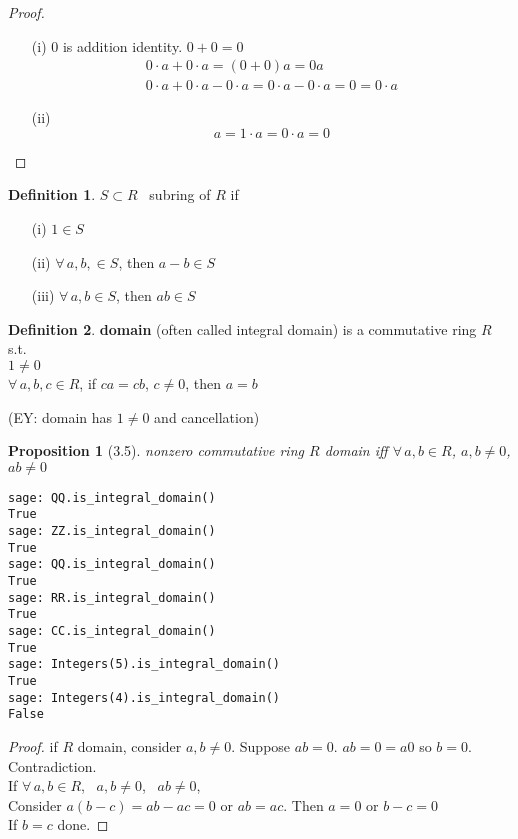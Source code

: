 \documentclass[twoside,landscape]{amsart}
\theoremstyle{plain}
\newtheorem{proposition}{Proposition}
\theoremstyle{definition}
\newtheorem{definition}{Definition}
\theoremstyle{remark}
\begin{document}
\begin{multicols*}{2}
\begin{proof}
  \begin{enumerate}
    \item[(i)] $0$ is addition identity.  $0+0 =0$ \quad \,
\[
\begin{gathered}
  0\cdot a + 0 \cdot a = (  0 + 0 ) a = 0 a \\ 
  0 \cdot a + 0 \cdot a -  0\cdot a = 0 \cdot a - 0\cdot a = 0 = 0\cdot a
\end{gathered}
\]
    \item[(ii)] 
\[
a = 1 \cdot a = 0\cdot a = 0 
\]
\end{enumerate}
\end{proof}


\begin{definition}
$S \subset R$ \quad \, subring of $R$ if 
\begin{enumerate}
\item[(i)] $ 1 \in S$ 
\item[(ii)] $\forall \, a,b, \in S$, then $a-b\in S$ \\ 
\item[(iii)] $\forall \, a,b \in S$, then $ab \in S$
\end{enumerate}
\end{definition}

\begin{definition}
  \textbf{domain} (often called integral domain) is a commutative ring $R$ s.t.  \\
$1 \neq 0$ \\
$\forall \, a,b, c \in R$, if $ca=cb$, $c\neq 0$, then $a=b$

(EY: domain has $1\neq 0$ and cancellation)
\end{definition}


\begin{proposition}[3.5]
nonzero commutative ring $R$ domain iff $\forall \, a,b \in R$, $a,b \neq 0$, $ab\neq 0$
\end{proposition}


\begin{lstlisting}
sage: QQ.is_integral_domain()
True
sage: ZZ.is_integral_domain()
True
sage: QQ.is_integral_domain()
True
sage: RR.is_integral_domain()
True
sage: CC.is_integral_domain()
True
sage: Integers(5).is_integral_domain()
True
sage: Integers(4).is_integral_domain()
False
\end{lstlisting}

\begin{proof}
  if $R$ domain, consider $a,b \neq 0$.  Suppose $ab=0$.  $ab=0 = a0$ so $b=0$.  Contradiction.  \\
If $\forall \, a,b \in R$, \, $a,b \neq 0$, \, $ab\neq 0$,  \\
Consider $a(b-c) = ab-ac=0$ or $ab=ac$.  Then $a=0$ or $b-c =0$ \\
If $b=c$ done.  


\end{proof}
\end{multicols*}
\end{document}
